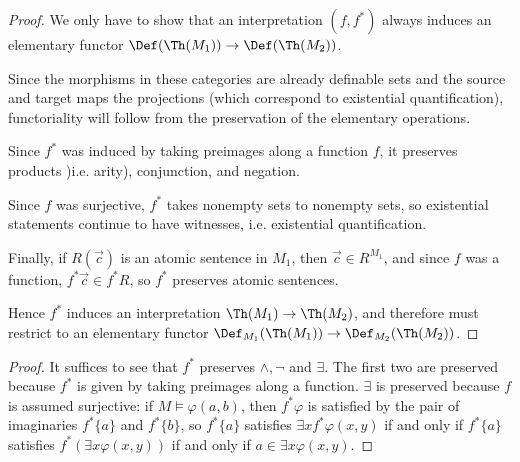 \begin{proof}
  We only have to show that an interpretation \((f,f^*)\) always induces an elementary functor \(\Def(\Th(M_1)) \to \Def(\Th(M_2))\).

  Since the morphisms in these categories are already definable sets and the source and target maps the projections (which correspond to existential quantification), functoriality will follow from the preservation of the elementary operations.

  Since \(f^*\) was induced by taking preimages along a function \(f\), it preserves products )i.e. arity), conjunction, and negation.

  Since \(f\) was surjective, \(f^*\) takes nonempty sets to nonempty sets, so existential statements continue to have witnesses, i.e. existential quantification.

  Finally, if $R(\vec{c})$ is an atomic sentence in $M_1$, then $\vec{c} \in R^{M_1}$, and since $f$ was a function, $f^* \vec{c} \in f^*R$, so $f^*$ preserves atomic sentences.

  Hence \(f^*\) induces an interpretation \(\Th(M_1) \to \Th(M_2)\), and therefore must restrict to an elementary functor \(\Def_{M_1}(\Th(M_1)) \to \Def_{M_2}(\Th(M_2))\).
\end{proof}





\begin{proof}It suffices to see that \(f^*\) preserves \(\land, \neg\) and \(\exists\). The first two are preserved because \(f^*\) is given by taking preimages along a function. \(\exists\) is preserved because \(f\) is assumed surjective: if \(M \models \varphi(a,b)\), then \(f^*\varphi\) is satisfied by the pair of imaginaries \(f^*\{a\}\) and \(f^*\{b\}\), so \(f^*\{a\}\) satisfies \(\exists x f^*\varphi(x, y)\) if and only if \(f^*\{a\}\) satisfies \(f^* \left(\exists x\varphi(x,y)\right)\) if and only if \(a \in \exists x \varphi(x,y).\) \end{proof}


